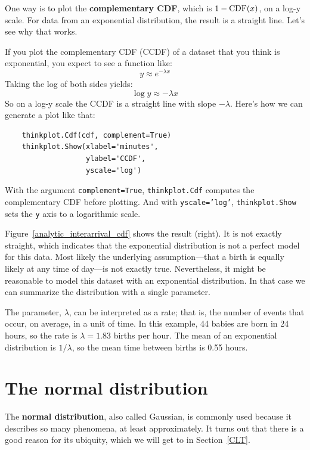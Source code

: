 \documentclass[12pt]{book}
\begin{document}
One way is to plot the {\bf complementary CDF}, which is $1 - \mathrm{CDF}(x)$,
on a log-y scale.  For data from an exponential distribution, the
result is a straight line.  Let's see why that works.
  

If you plot the complementary CDF (CCDF) of a dataset that you think is
exponential, you expect to see a function like:
%
\[ y \approx e^{-\lambda x} \]
%
Taking the log of both sides yields:
%
\[ \log y \approx -\lambda x\]
%
So on a log-y scale the CCDF is a straight line
with slope $-\lambda$.  Here's how we can generate a plot like that:


\begin{verbatim}
    thinkplot.Cdf(cdf, complement=True)
    thinkplot.Show(xlabel='minutes',
                   ylabel='CCDF',
                   yscale='log')
\end{verbatim}

With the argument {\tt complement=True}, {\tt thinkplot.Cdf} computes
the complementary CDF before plotting.  And with {\tt yscale='log'},
{\tt thinkplot.Show} sets the {\tt y} axis to a logarithmic scale.

Figure~\ref{analytic_interarrival_cdf} shows the result (right).  It is not
exactly straight, which indicates that the exponential distribution is
not a perfect model for this data.  Most likely the underlying
assumption---that a birth is equally likely at any time of day---is
not exactly true.  Nevertheless, it might be reasonable to model this
dataset with an exponential distribution.  In that case we can
summarize the distribution with a single parameter.

The parameter, $\lambda$, can be interpreted as a rate; that is, the
number of events that occur, on average, in a unit of time.  In this
example, 44 babies are born in 24 hours, so the rate is $\lambda =
1.83$ births per hour.  The mean of an exponential distribution is
$1/\lambda$, so the mean time between births is 0.55 hours.


\section{The normal distribution}
\label{normal}

The {\bf normal distribution}, also called Gaussian, is commonly
used because it describes so many phenomena, at least approximately.
It turns out that there is a good reason for its ubiquity, which we
will get to in Section~\ref{CLT}.
\end{document}
